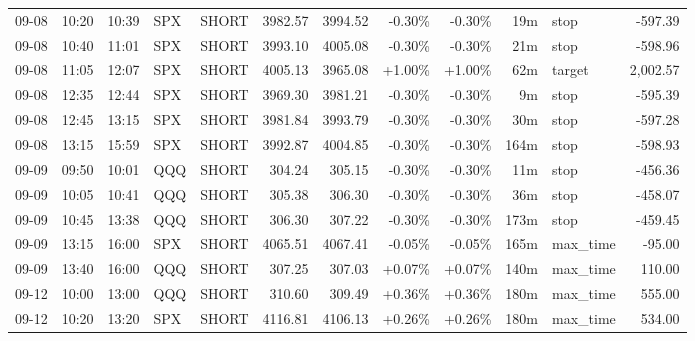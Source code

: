\documentclass[11pt,a4paper,twoside]{article}
\begin{document}
\begin{center}
\begin{longtable}{>{\color{txtmain}}l l l l l r r r r r >{\color{txtmain}}l r}
09-08 & 10:20 & 10:39 & SPX & SHORT & 3982.57 & 3994.52 & \textcolor{lossred}{-0.30\%} & \textcolor{lossred}{-0.30\%} & 19m & stop & \textcolor{lossred}{-597.39} \\
09-08 & 10:40 & 11:01 & SPX & SHORT & 3993.10 & 4005.08 & \textcolor{lossred}{-0.30\%} & \textcolor{lossred}{-0.30\%} & 21m & stop & \textcolor{lossred}{-598.96} \\
09-08 & 11:05 & 12:07 & SPX & SHORT & 4005.13 & 3965.08 & \textcolor{wingreen}{+1.00\%} & \textcolor{wingreen}{+1.00\%} & 62m & target & \textcolor{wingreen}{2,002.57} \\
09-08 & 12:35 & 12:44 & SPX & SHORT & 3969.30 & 3981.21 & \textcolor{lossred}{-0.30\%} & \textcolor{lossred}{-0.30\%} & 9m & stop & \textcolor{lossred}{-595.39} \\
09-08 & 12:45 & 13:15 & SPX & SHORT & 3981.84 & 3993.79 & \textcolor{lossred}{-0.30\%} & \textcolor{lossred}{-0.30\%} & 30m & stop & \textcolor{lossred}{-597.28} \\
09-08 & 13:15 & 15:59 & SPX & SHORT & 3992.87 & 4004.85 & \textcolor{lossred}{-0.30\%} & \textcolor{lossred}{-0.30\%} & 164m & stop & \textcolor{lossred}{-598.93} \\
09-09 & 09:50 & 10:01 & QQQ & SHORT & 304.24 & 305.15 & \textcolor{lossred}{-0.30\%} & \textcolor{lossred}{-0.30\%} & 11m & stop & \textcolor{lossred}{-456.36} \\
09-09 & 10:05 & 10:41 & QQQ & SHORT & 305.38 & 306.30 & \textcolor{lossred}{-0.30\%} & \textcolor{lossred}{-0.30\%} & 36m & stop & \textcolor{lossred}{-458.07} \\
09-09 & 10:45 & 13:38 & QQQ & SHORT & 306.30 & 307.22 & \textcolor{lossred}{-0.30\%} & \textcolor{lossred}{-0.30\%} & 173m & stop & \textcolor{lossred}{-459.45} \\
09-09 & 13:15 & 16:00 & SPX & SHORT & 4065.51 & 4067.41 & \textcolor{lossred}{-0.05\%} & \textcolor{lossred}{-0.05\%} & 165m & max\_time & \textcolor{lossred}{-95.00} \\
09-09 & 13:40 & 16:00 & QQQ & SHORT & 307.25 & 307.03 & \textcolor{wingreen}{+0.07\%} & \textcolor{wingreen}{+0.07\%} & 140m & max\_time & \textcolor{wingreen}{110.00} \\
09-12 & 10:00 & 13:00 & QQQ & SHORT & 310.60 & 309.49 & \textcolor{wingreen}{+0.36\%} & \textcolor{wingreen}{+0.36\%} & 180m & max\_time & \textcolor{wingreen}{555.00} \\
09-12 & 10:20 & 13:20 & SPX & SHORT & 4116.81 & 4106.13 & \textcolor{wingreen}{+0.26\%} & \textcolor{wingreen}{+0.26\%} & 180m & max\_time & \textcolor{wingreen}{534.00} \\

\end{longtable}
\end{center}
\end{document}
